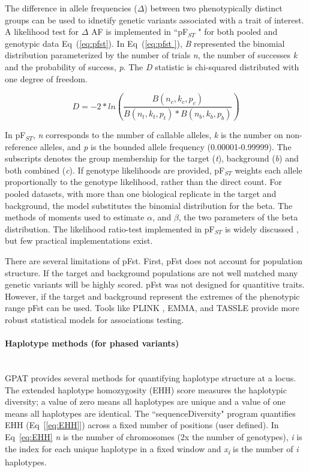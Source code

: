 \documentclass[10pt,letterpaper]{article}
\begin{document}
The difference in allele frequencies ($\Delta$) between two phenotypically distinct groups can be used to idnetify genetic variants associated with a trait of interest.  A likelihood test for $\Delta$ AF is implemented in ``pF$_{ST}$ " for both pooled and genotypic data Eq~(\ref{eq:pfst}).   In Eq~(\ref{eq:pfst }), \textit{B} represented the binomial distribution parameterized by the number of trials \textit{n}, the number of successes \textit{k} and the probability of success, \textit{p}.  The \textit{D} statistic is chi-squared distributed with one degree of freedom.

\begin{equation}\label{eq:pfst} 
D=-2* ln (\frac{ B(n_c,k_c,p_c) }{ B(n_t,k_t,p_t)*B(n_b,k_b,p_b)  })
\end{equation}

In pF$_{ST}$, \textit{n} corresponds to the number of callable alleles, \textit{k} is the number on non-reference alleles, and \textit{p} is the bounded allele frequency (0.00001-0.99999).  The subscripts denotes the group membership for the target (\textit{t}), background (\textit{b}) and both combined (\textit{c}).  If genotype likelihoods are provided, pF$_{ST}$  weights each allele proportionally to the genotype likelihood, rather than the direct count.   For pooled datasets, with more than one biological replicate in the target and background, the model substitutes the binomial distribution for the beta.  The methods of moments used to estimate $\alpha$, and $\beta$, the two parameters of the beta distribution.  The likelihood ratio-test implemented in pF$_{ST}$ is widely discussed \cite{kim,heng}, but few practical implementations exist.  

There are several limitations of pFst.  First, pFst does not account for population structure.  If the target and background populations are not well matched many genetic variants will be highly scored.  pFst was not designed for quantitive traits.  However, if the target and background represent the extremes of the phenotypic range pFst can be used.  Tools like PLINK \cite{plink}, EMMA\cite{emma}, and TASSLE\cite{tassel} provide more robust statistical models for associations testing.

\paragraph*{Haplotype methods (for phased variants) }\mbox{} \\

GPAT provides several methods for quantifying haplotype structure at a locus.  The extended haplotype homozygosity (EHH) score measures the haplotypic diversity; a value of zero means all haplotypes are unique and a value of one means all haplotypes are identical. The ``sequenceDiversity" program quantifies EHH (Eq~[\ref{eq:EHH}]) across a fixed number of positions (user defined). In Eq~\ref{eq:EHH} \textit{n} is the number of chromosomes (2x the number of genotypes), \textit{i} is the index for each unique haplotype in a fixed window and \textit{x\textsubscript{i}} is the number of \textit{i} haplotypes.  
\end{document}
